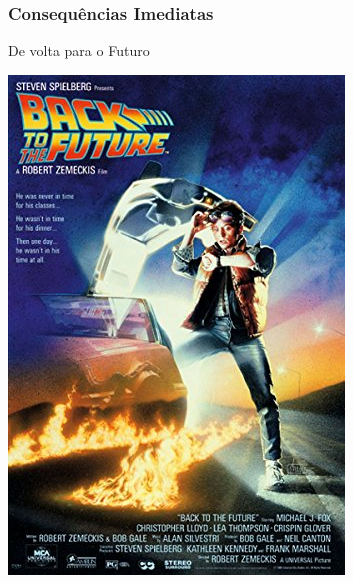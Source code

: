 \begin{frame}
    \frametitle{Consequências Imediatas}
    
    \alert{De volta para o Futuro}

    \includegraphics[height=0.8\textheight]{img/posters/bttf.jpg}
\end{frame}

